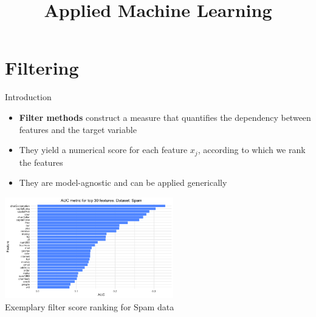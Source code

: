 \documentclass[11pt,compress,t,notes=noshow, xcolor=table]{beamer}
\title{Applied Machine Learning}
\date{}
\begin{document}


\section{Filtering}


%  

\begin{frame2}{Introduction}
  \vspace{0.4cm}
  \begin{itemize}
  \setlength{\itemsep}{0.8em}
    \item \textbf{Filter methods} construct a measure that quantifies the dependency between features and the target variable
    \item They yield a numerical score for each feature $x_j$, according to which we rank the features
    \item They are model-agnostic and can be applied generically
  \end{itemize}
  \vspace{-0.2cm}
  \begin{center}
  \includegraphics[width=0.55\textwidth]{sl/feature-selection/figure/fs-auc-barplot.png}\\
  \footnotesize{Exemplary filter score ranking for Spam data}
  \end{center}
  
\end{frame2}

\end{document}
